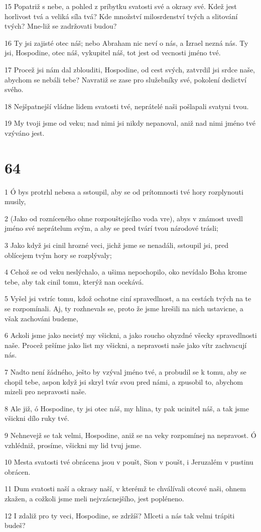 \par 15 Popatriž s nebe, a pohled z príbytku svatosti své a okrasy své. Kdež jest horlivost tvá a veliká síla tvá? Kde množství milosrdenství tvých a slitování tvých? Mne-liž se zadržovati budou?
\par 16 Ty jsi zajisté otec náš; nebo Abraham nic neví o nás, a Izrael nezná nás. Ty jsi, Hospodine, otec náš, vykupitel náš, tot jest od vecnosti jméno tvé.
\par 17 Procež jsi nám dal zblouditi, Hospodine, od cest svých, zatvrdil jsi srdce naše, abychom se nebáli tebe? Navratiž se zase pro služebníky své, pokolení dedictví svého.
\par 18 Nejšpatnejší vládne lidem svatosti tvé, neprátelé naši pošlapali svatyni tvou.
\par 19 My tvoji jsme od veku; nad nimi jsi nikdy nepanoval, aniž nad nimi jméno tvé vzýváno jest.

\chapter{64}

\par 1 Ó bys protrhl nebesa a sstoupil, aby se od prítomnosti tvé hory rozplynouti musily,
\par 2 (Jako od rozníceného ohne rozpouštejícího voda vre), abys v známost uvedl jméno své neprátelum svým, a aby se pred tvárí tvou národové trásli;
\par 3 Jako když jsi cinil hrozné veci, jichž jsme se nenadáli, sstoupil jsi, pred oblícejem tvým hory se rozplývaly;
\par 4 Cehož se od veku neslýchalo, a ušima nepochopilo, oko nevídalo Boha krome tebe, aby tak cinil tomu, kterýž nan ocekává.
\par 5 Vyšel jsi vstríc tomu, kdož ochotne ciní spravedlnost, a na cestách tvých na te se rozpomínali. Aj, ty rozhnevals se, proto že jsme hrešili na nich ustavicne, a však zachováni budeme,
\par 6 Ackoli jsme jako necistý my všickni, a jako roucho ohyzdné všecky spravedlnosti naše. Procež pršíme jako list my všickni, a nepravosti naše jako vítr zachvacují nás.
\par 7 Nadto není žádného, ješto by vzýval jméno tvé, a probudil se k tomu, aby se chopil tebe, aspon když jsi skryl tvár svou pred námi, a zpusobil to, abychom mizeli pro nepravosti naše.
\par 8 Ale již, ó Hospodine, ty jsi otec náš, my hlina, ty pak ucinitel náš, a tak jsme všickni dílo ruky tvé.
\par 9 Nehnevejž se tak velmi, Hospodine, aniž se na veky rozpomínej na nepravost. Ó vzhlédniž, prosíme, všickni my lid tvuj jsme.
\par 10 Mesta svatosti tvé obrácena jsou v poušt, Sion v poušt, i Jeruzalém v pustinu obrácen.
\par 11 Dum svatosti naší a okrasy naší, v kterémž te chválívali otcové naši, ohnem zkažen, a cožkoli jsme meli nejvzácnejšího, jest popléneno.
\par 12 I zdaliž pro ty veci, Hospodine, se zdržíš? Mlceti a nás tak velmi trápiti budeš?

